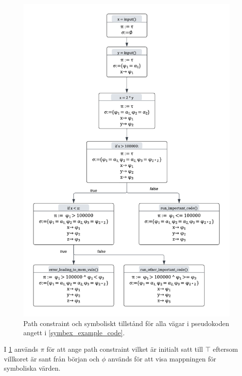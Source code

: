 \begin{figure}[H]
\centering
\includegraphics[scale=0.5]{figures/final_symbolic_example_graph.png}
\caption{Path constraint och symboliskt tillstånd för alla vägar i
    pseudokoden angett i \ref{symbex_example_code}.}
\label{symbex_example_graph}
\end{figure}

I \ref{symbex_example_graph} används $\pi$ för att ange path constraint vilket
är initialt satt till $\top$ eftersom villkoret är sant från början och $\phi$
används för att visa mappningen för symboliska värden.

